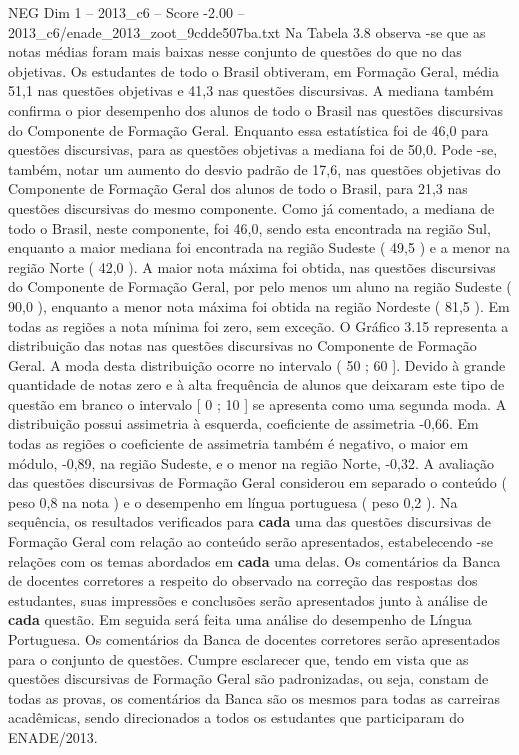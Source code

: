 \begin{textsample}{NEG Dim 1 – 2013\_c6 – Score -2.00 – 2013\_c6/enade\_2013\_zoot\_9cdde507ba.txt}
Na Tabela 3.8 observa -se que as notas médias foram mais baixas nesse conjunto de questões do que no das objetivas.
Os estudantes de todo o Brasil obtiveram, em Formação Geral, média 51,1 nas questões objetivas e 41,3 nas questões discursivas.
A mediana também confirma o pior desempenho dos alunos de todo o Brasil nas questões discursivas do Componente de Formação Geral.
Enquanto essa estatística foi de 46,0 para questões discursivas, para as questões objetivas a mediana foi de 50,0.
Pode -se, também, notar um aumento do desvio padrão de 17,6, nas questões objetivas do Componente de Formação Geral dos alunos de todo o Brasil, para 21,3 nas questões discursivas do mesmo componente.
Como já comentado, a mediana de todo o Brasil, neste componente, foi 46,0, sendo esta encontrada na região Sul, enquanto a maior mediana foi encontrada na região Sudeste ( 49,5 ) e a menor na região Norte ( 42,0 ).
A maior nota máxima foi obtida, nas questões discursivas do Componente de Formação Geral, por pelo menos um aluno na região Sudeste ( 90,0 ), enquanto a menor nota máxima foi obtida na região Nordeste ( 81,5 ).
Em todas as regiões a nota mínima foi zero, sem exceção.
O Gráfico 3.15 representa a distribuição das notas nas questões discursivas no Componente de Formação Geral.
A moda desta distribuição ocorre no intervalo ( 50 ; 60 ].
Devido à grande quantidade de notas zero e à alta frequência de alunos que deixaram este tipo de questão em branco o intervalo [ 0 ; 10 ] se apresenta como uma segunda moda.
A distribuição possui assimetria à esquerda, coeficiente de assimetria -0,66.
Em todas as regiões o coeficiente de assimetria também é negativo, o maior em módulo, -0,89, na região Sudeste, e o menor na região Norte, -0,32.
A avaliação das questões discursivas de Formação Geral considerou em separado o conteúdo ( peso 0,8 na nota ) e o desempenho em língua portuguesa ( peso 0,2 ).
Na sequência, os resultados verificados para \textbf{cada} uma das questões discursivas de Formação Geral com relação ao conteúdo serão apresentados, estabelecendo -se relações com os temas abordados em \textbf{cada} uma delas.
Os comentários da Banca de docentes corretores a respeito do observado na correção das respostas dos estudantes, suas impressões e conclusões serão apresentados junto à análise de \textbf{cada} questão.
Em seguida será feita uma análise do desempenho de Língua Portuguesa.
Os comentários da Banca de docentes corretores serão apresentados para o conjunto de questões.
Cumpre esclarecer que, tendo em vista que as questões discursivas de Formação Geral são padronizadas, ou seja, constam de todas as provas, os comentários da Banca são os mesmos para todas as carreiras acadêmicas, sendo direcionados a todos os estudantes que participaram do ENADE/2013.

\end{textsample}
